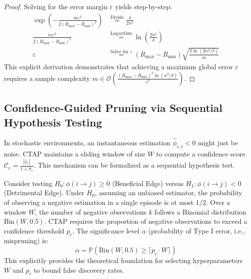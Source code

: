 \documentclass{article}
\begin{document}
\begin{proof}
Solving for the error margin $\varepsilon$ yields step-by-step:
\begin{align}
    \exp\left(-\frac{m\varepsilon^2}{2(R_{\max} - R_{\min})^2}\right) &\overset{\text{Divide}}{=} \frac{\delta}{2n^2} \\
    \frac{m\varepsilon^2}{2(R_{\max} - R_{\min})^2} &\overset{\text{Logarithm}}{=} \ln\left(\frac{2n^2}{\delta}\right) \\
    \varepsilon &\overset{\text{Solve for } \varepsilon}{=} (R_{\max} - R_{\min}) \sqrt{\frac{2\ln(2n^2/\delta)}{m}}
\end{align}
This explicit derivation demonstrates that achieving a maximum global error $\varepsilon$ requires a sample complexity $m \in \mathcal{O}\left(\frac{(R_{\max}-R_{\min})^2\ln(n^2/\delta)}{\varepsilon^2}\right)$.
\end{proof}

\subsection{Confidence-Guided Pruning via Sequential Hypothesis Testing}
In stochastic environments, an instantaneous estimation $\hat{\phi}_{e, t} < 0$ might just be noise. CTAP maintains a sliding window of size $W$ to compute a confidence score $\mathcal{C}_e = \frac{|\bar{\phi}_e|}{1 + \hat{\sigma}_e}$. This mechanism can be formalized as a sequential hypothesis test.

Consider testing $H_0: \phi(i \to j) \ge 0$ (Beneficial Edge) versus $H_1: \phi(i \to j) < 0$ (Detrimental Edge). Under $H_0$, assuming an unbiased estimator, the probability of observing a negative estimation in a single episode is at most $1/2$. Over a window $W$, the number of negative observations $k$ follows a Binomial distribution $\text{Bin}(W, 0.5)$. CTAP requires the proportion of negative observations to exceed a confidence threshold $p_c$. The significance level $\alpha$ (probability of Type I error, i.e., mispruning) is:
\begin{equation}
    \alpha = \mathbb{P}\left(\text{Bin}(W, 0.5) \ge \lceil p_c \cdot W \rceil\right)
\end{equation}
This explicitly provides the theoretical foundation for selecting hyperparameters $W$ and $p_c$ to bound false discovery rates.
\end{document}

